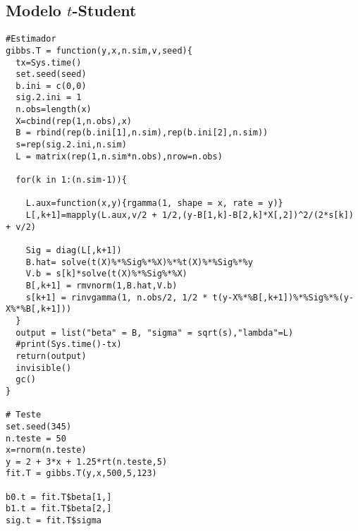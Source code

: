 \subsection{Modelo $t$-Student}
\begin{lstlisting}
#Estimador
gibbs.T = function(y,x,n.sim,v,seed){
  tx=Sys.time()
  set.seed(seed)
  b.ini = c(0,0)
  sig.2.ini = 1
  n.obs=length(x)
  X=cbind(rep(1,n.obs),x)
  B = rbind(rep(b.ini[1],n.sim),rep(b.ini[2],n.sim))
  s=rep(sig.2.ini,n.sim)
  L = matrix(rep(1,n.sim*n.obs),nrow=n.obs)
  
  for(k in 1:(n.sim-1)){

    L.aux=function(x,y){rgamma(1, shape = x, rate = y)}
    L[,k+1]=mapply(L.aux,v/2 + 1/2,(y-B[1,k]-B[2,k]*X[,2])^2/(2*s[k]) + v/2)
    
    Sig = diag(L[,k+1])
    B.hat= solve(t(X)%*%Sig%*%X)%*%t(X)%*%Sig%*%y
    V.b = s[k]*solve(t(X)%*%Sig%*%X)
    B[,k+1] = rmvnorm(1,B.hat,V.b)
    s[k+1] = rinvgamma(1, n.obs/2, 1/2 * t(y-X%*%B[,k+1])%*%Sig%*%(y-X%*%B[,k+1]))
  }
  output = list("beta" = B, "sigma" = sqrt(s),"lambda"=L)
  #print(Sys.time()-tx)
  return(output)
  invisible()
  gc()
}

# Teste
set.seed(345)
n.teste = 50
x=rnorm(n.teste)
y = 2 + 3*x + 1.25*rt(n.teste,5)
fit.T = gibbs.T(y,x,500,5,123)

b0.t = fit.T$beta[1,]
b1.t = fit.T$beta[2,]
sig.t = fit.T$sigma
\end{lstlisting}

